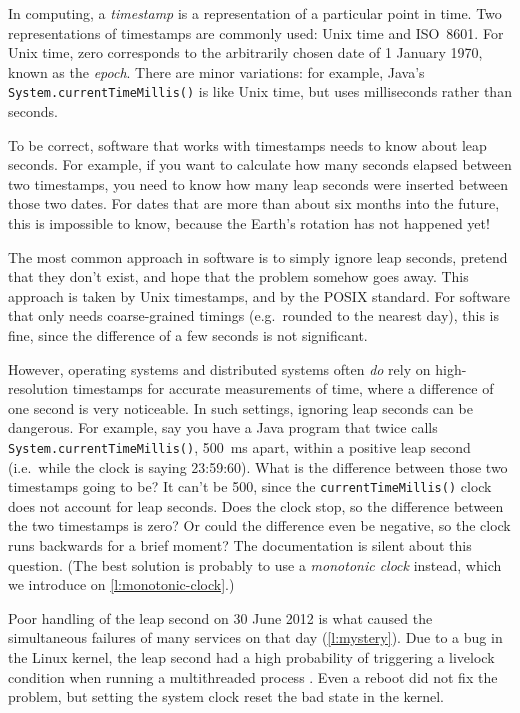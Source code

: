 In computing, a \emph{timestamp} is a representation of a particular point in time.
Two representations of timestamps are commonly used: Unix time and ISO~8601.
For Unix time, zero corresponds to the arbitrarily chosen date of 1 January 1970, known as the \emph{epoch}.
There are minor variations: for example, Java's \verb|System.currentTimeMillis()| is like Unix time, but uses milliseconds rather than seconds.

To be correct, software that works with timestamps needs to know about leap seconds.
For example, if you want to calculate how many seconds elapsed between two timestamps, you need to know how many leap seconds were inserted between those two dates.
For dates that are more than about six months into the future, this is impossible to know, because the Earth's rotation has not happened yet!

The most common approach in software is to simply ignore leap seconds, pretend that they don't exist, and hope that the problem somehow goes away.
This approach is taken by Unix timestamps, and by the POSIX standard.
For software that only needs coarse-grained timings (e.g.\ rounded to the nearest day), this is fine, since the difference of a few seconds is not significant.

However, operating systems and distributed systems often \emph{do} rely on high-resolution timestamps for accurate measurements of time, where a difference of one second is very noticeable.
In such settings, ignoring leap seconds can be dangerous.
For example, say you have a Java program that twice calls \verb|System.currentTimeMillis()|, 500~ms apart, within a positive leap second (i.e.\ while the clock is saying 23:59:60).
What is the difference between those two timestamps going to be?
It can't be 500, since the \verb|currentTimeMillis()| clock does not account for leap seconds.
Does the clock stop, so the difference between the two timestamps is zero?
Or could the difference even be negative, so the clock runs backwards for a brief moment?
The documentation is silent about this question.
(The best solution is probably to use a \emph{monotonic clock} instead, which we introduce on \autoref{l:monotonic-clock}.)

Poor handling of the leap second on 30 June 2012 is what caused the simultaneous failures of many services on that day (\autoref{l:mystery}).
Due to a bug in the Linux kernel, the leap second had a high probability of triggering a livelock condition when running a multithreaded process \citep{Allen:2013,Minar:2012}.
Even a reboot did not fix the problem, but setting the system clock reset the bad state in the kernel.

